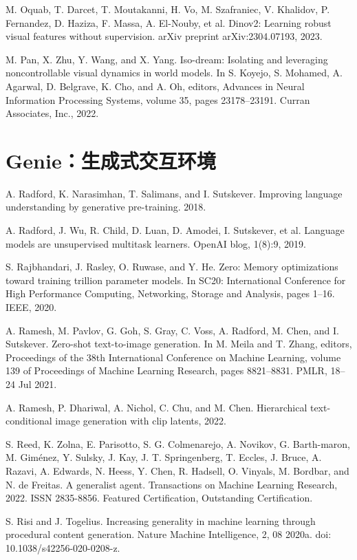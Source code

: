 \documentclass[10pt]{article}
\begin{document}
M. Oquab, T. Darcet, T. Moutakanni, H. Vo, M. Szafraniec, V. Khalidov, P. Fernandez, D. Haziza, F. Massa, A. El-Nouby, et al. Dinov2: Learning robust visual features without supervision. arXiv preprint arXiv:2304.07193, 2023.

M. Pan, X. Zhu, Y. Wang, and X. Yang. Iso-dream: Isolating and leveraging noncontrollable visual dynamics in world models. In S. Koyejo, S. Mohamed, A. Agarwal, D. Belgrave, K. Cho, and A. Oh, editors, Advances in Neural Information Processing Systems, volume 35, pages 23178–23191. Curran Associates, Inc., 2022.

\section*{Genie：生成式交互环境}
A. Radford, K. Narasimhan, T. Salimans, and I. Sutskever. Improving language understanding by generative pre-training. 2018.

A. Radford, J. Wu, R. Child, D. Luan, D. Amodei, I. Sutskever, et al. Language models are unsupervised multitask learners. OpenAI blog, 1(8):9, 2019.

S. Rajbhandari, J. Rasley, O. Ruwase, and Y. He. Zero: Memory optimizations toward training trillion parameter models. In SC20: International Conference for High Performance Computing, Networking, Storage and Analysis, pages 1–16. IEEE, 2020.

A. Ramesh, M. Pavlov, G. Goh, S. Gray, C. Voss, A. Radford, M. Chen, and I. Sutskever. Zero-shot text-to-image generation. In M. Meila and T. Zhang, editors, Proceedings of the 38th International Conference on Machine Learning, volume 139 of Proceedings of Machine Learning Research, pages 8821–8831. PMLR, 18–24 Jul 2021.

A. Ramesh, P. Dhariwal, A. Nichol, C. Chu, and M. Chen. Hierarchical text-conditional image generation with clip latents, 2022.

S. Reed, K. Zolna, E. Parisotto, S. G. Colmenarejo, A. Novikov, G. Barth-maron, M. Giménez, Y. Sulsky, J. Kay, J. T. Springenberg, T. Eccles, J. Bruce, A. Razavi, A. Edwards, N. Heess, Y. Chen, R. Hadsell, O. Vinyals, M. Bordbar, and N. de Freitas. A generalist agent. Transactions on Machine Learning Research, 2022. ISSN 2835-8856. Featured Certification, Outstanding Certification.

S. Risi and J. Togelius. Increasing generality in machine learning through procedural content generation. Nature Machine Intelligence, 2, 08 2020a. doi: 10.1038/s42256-020-0208-z.
\end{document}
